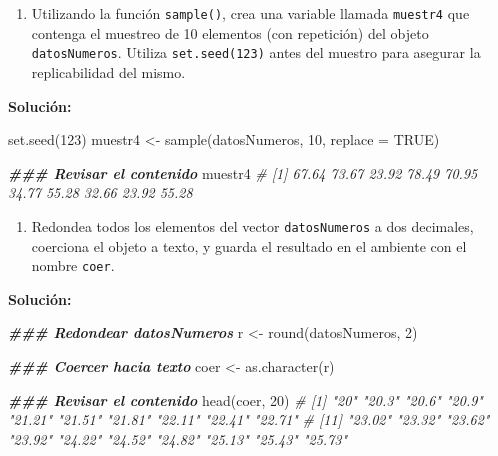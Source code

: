 \documentclass[
]{article}
\newenvironment{Shaded}{\begin{snugshade}}{\end{snugshade}}
\newcommand{\AttributeTok}[1]{\textcolor[rgb]{0.77,0.63,0.00}{#1}}
\newcommand{\CommentTok}[1]{\textcolor[rgb]{0.56,0.35,0.01}{\textit{#1}}}
\newcommand{\ConstantTok}[1]{\textcolor[rgb]{0.00,0.00,0.00}{#1}}
\newcommand{\DecValTok}[1]{\textcolor[rgb]{0.00,0.00,0.81}{#1}}
\newcommand{\DocumentationTok}[1]{\textcolor[rgb]{0.56,0.35,0.01}{\textbf{\textit{#1}}}}
\newcommand{\FunctionTok}[1]{\textcolor[rgb]{0.00,0.00,0.00}{#1}}
\newcommand{\NormalTok}[1]{#1}
\newcommand{\OtherTok}[1]{\textcolor[rgb]{0.56,0.35,0.01}{#1}}
\providecommand{\tightlist}{%
  \setlength{\itemsep}{0pt}\setlength{\parskip}{0pt}}
\theoremstyle{definition}
\theoremstyle{definition}
\theoremstyle{definition}
\theoremstyle{definition}
\theoremstyle{remark}
\begin{document}
\begin{enumerate}
\def\labelenumi{\arabic{enumi}.}
\tightlist
\item
  Utilizando la función \texttt{sample()}, crea una variable llamada \texttt{muestr4} que contenga el muestreo de 10 elementos (con repetición) del objeto \texttt{datosNumeros}. Utiliza \texttt{set.seed(123)}
  antes del muestro para asegurar la replicabilidad del mismo.
\end{enumerate}

\textbf{Solución:}

\begin{Shaded}
\begin{Highlighting}[]
\FunctionTok{set.seed}\NormalTok{(}\DecValTok{123}\NormalTok{)}
\NormalTok{muestr4 }\OtherTok{\textless{}{-}} \FunctionTok{sample}\NormalTok{(datosNumeros, }\DecValTok{10}\NormalTok{, }\AttributeTok{replace =} \ConstantTok{TRUE}\NormalTok{)}

\DocumentationTok{\#\#\# Revisar el contenido}
\NormalTok{muestr4}
\CommentTok{\#  [1] 67.64 73.67 23.92 78.49 70.95 34.77 55.28 32.66 23.92 55.28}
\end{Highlighting}
\end{Shaded}

\begin{enumerate}
\def\labelenumi{\arabic{enumi}.}
\tightlist
\item
  Redondea todos los elementos del vector \texttt{datosNumeros} a dos decimales, coerciona el objeto a texto, y guarda el resultado en el ambiente con el nombre \texttt{coer}.
\end{enumerate}

\textbf{Solución:}

\begin{Shaded}
\begin{Highlighting}[]
\DocumentationTok{\#\#\# Redondear datosNumeros}
\NormalTok{r }\OtherTok{\textless{}{-}} \FunctionTok{round}\NormalTok{(datosNumeros, }\DecValTok{2}\NormalTok{)}

\DocumentationTok{\#\#\# Coercer hacia texto}
\NormalTok{coer }\OtherTok{\textless{}{-}} \FunctionTok{as.character}\NormalTok{(r) }

\DocumentationTok{\#\#\# Revisar el contenido}
\FunctionTok{head}\NormalTok{(coer, }\DecValTok{20}\NormalTok{)}
\CommentTok{\#  [1] "20"    "20.3"  "20.6"  "20.9"  "21.21" "21.51" "21.81" "22.11" "22.41" "22.71"}
\CommentTok{\# [11] "23.02" "23.32" "23.62" "23.92" "24.22" "24.52" "24.82" "25.13" "25.43" "25.73"}
\end{Highlighting}
\end{Shaded}
\end{document}
